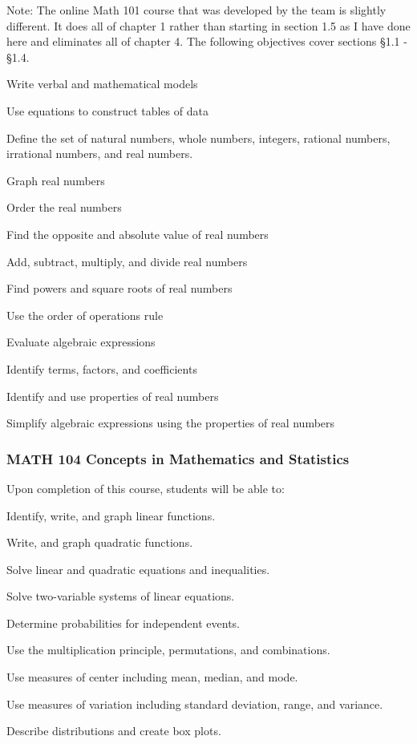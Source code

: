 Note: The online Math 101 course that was developed by the team is slightly different.
It does all of chapter 1 rather than starting in section 1.5 as I have done here and eliminates all of chapter 4. 
The following objectives cover sections \S 1.1 - \S 1.4.
 
\begin{alphalist}
    \item Write verbal and mathematical models
    \item Use equations to construct tables of data
    \item Define the set of natural numbers, whole numbers, integers, rational numbers, irrational numbers, and real numbers.
    \item Graph real numbers
    \item Order the real numbers
    \item Find the opposite and absolute value of real numbers
    \item Add, subtract, multiply, and divide real numbers
    \item Find powers and square roots of real numbers
    \item Use the order of operations rule
    \item Evaluate algebraic expressions
    \item Identify terms, factors, and coefficients
    \item Identify and use properties of real numbers
    \item Simplify algebraic expressions using the properties of real numbers

\end{alphalist}



\subsubsection{MATH 104  Concepts in Mathematics and Statistics}


Upon completion of this course, students will be able to:
\begin{alphalist}
    \item Identify, write, and graph linear functions.
    \item Write, and graph quadratic functions.
    \item Solve linear and quadratic equations and inequalities.
    \item Solve two-variable systems of linear equations.
    \item Determine probabilities for independent events.
    \item Use the multiplication principle, permutations, and combinations.
    \item Use measures of center including mean, median, and mode.
    \item Use measures of variation including standard deviation, range, and variance.
    \item Describe distributions and create box plots.
\end{alphalist}


